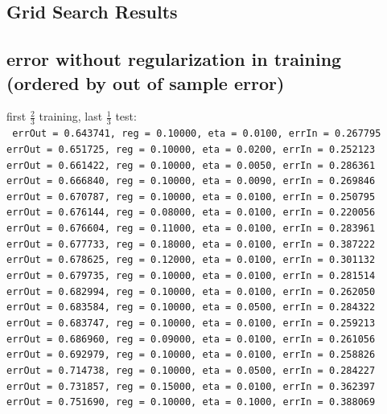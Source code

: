 \begin{appendices}
\pagebreak
\section{Grid Search Results}
\label{appendix:gridsearch}
\subsection{error without regularization in training (ordered by out of sample error)}

\noindent first $\frac{2}{3}$ training, last $\frac{1}{3}$ test: \\
\texttt{
  errOut = 0.643741, reg = 0.10000, eta = 0.0100, errIn = 0.267795 \\
  errOut = 0.651725, reg = 0.10000, eta = 0.0200, errIn = 0.252123 \\
  errOut = 0.661422, reg = 0.10000, eta = 0.0050, errIn = 0.286361 \\
  errOut = 0.666840, reg = 0.10000, eta = 0.0090, errIn = 0.269846 \\
  errOut = 0.670787, reg = 0.10000, eta = 0.0100, errIn = 0.250795 \\
  errOut = 0.676144, reg = 0.08000, eta = 0.0100, errIn = 0.220056 \\
  errOut = 0.676604, reg = 0.11000, eta = 0.0100, errIn = 0.283961 \\
  errOut = 0.677733, reg = 0.18000, eta = 0.0100, errIn = 0.387222 \\
  errOut = 0.678625, reg = 0.12000, eta = 0.0100, errIn = 0.301132 \\
  errOut = 0.679735, reg = 0.10000, eta = 0.0100, errIn = 0.281514 \\
  errOut = 0.682994, reg = 0.10000, eta = 0.0100, errIn = 0.262050 \\
  errOut = 0.683584, reg = 0.10000, eta = 0.0500, errIn = 0.284322 \\
  errOut = 0.683747, reg = 0.10000, eta = 0.0100, errIn = 0.259213 \\
  errOut = 0.686960, reg = 0.09000, eta = 0.0100, errIn = 0.261056 \\
  errOut = 0.692979, reg = 0.10000, eta = 0.0100, errIn = 0.258826 \\
  errOut = 0.714738, reg = 0.10000, eta = 0.0500, errIn = 0.284227 \\
  errOut = 0.731857, reg = 0.15000, eta = 0.0100, errIn = 0.362397 \\
  errOut = 0.751690, reg = 0.10000, eta = 0.1000, errIn = 0.388069 \\
}
\end{appendices}
